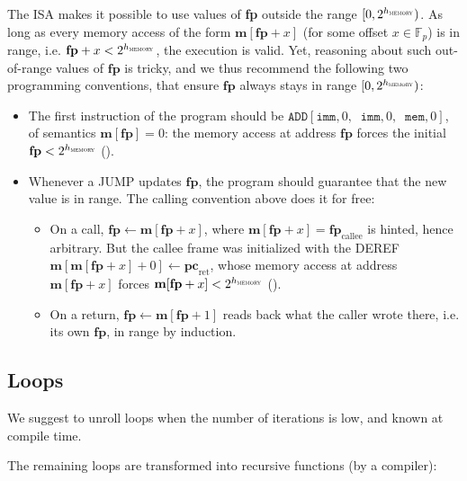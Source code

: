 \documentclass{article}
\theoremstyle{definition}
\newcommand{\Fp}{\mathbb F_p}
\begin{document}
\vspace{5mm}

The ISA makes it possible to use values of \textbf{fp} outside the range $[0, 2^{h_\textsc{memory}})$. As long as every memory access of the form $\textbf{m}[\textbf{fp} + x]$ (for some offset $x \in \Fp$) is in range, i.e. $\textbf{fp} + x < 2^{h_\textsc{memory}}$, the execution is valid. Yet, reasoning about such out-of-range values of $\textbf{fp}$ is tricky, and we thus recommend the following two programming conventions, that ensure $\textbf{fp}$ always stays in range $[0, 2^{h_\textsc{memory}})$:

\begin{itemize}
    \item The first instruction of the program should be $\texttt{ADD}[\texttt{imm}, 0,\;\; \texttt{imm}, 0,\;\; \texttt{mem}, 0]$, of semantics $\textbf{m}[\textbf{fp}] = 0$: the memory access at address $\textbf{fp}$ forces the initial $\textbf{fp} < 2^{h_\textsc{memory}}$ ().

    \item Whenever a JUMP updates $\textbf{fp}$, the program should guarantee that the new value is in range. The calling convention above does it for free:
    \begin{itemize}
        \item On a call, $\textbf{fp} \gets \textbf{m}[\textbf{fp} + x]$, where $\textbf{m}[\textbf{fp} + x] = \textbf{fp}_\text{callee}$ is hinted, hence arbitrary. But the callee frame was initialized with the DEREF $\textbf{m}[\textbf{m}[\textbf{fp} + x] + 0] \gets \textbf{pc}_\text{ret}$, whose memory access at address $\textbf{m}[\textbf{fp} + x]$ forces $\textbf{m}[\textbf{fp} + x] < 2^{h_\textsc{memory}}$ ().
        \item On a return, $\textbf{fp} \gets \textbf{m}[\textbf{fp} + 1]$ reads back what the caller wrote there, i.e. its own $\textbf{fp}$, in range by induction.
    \end{itemize}
\end{itemize}

\subsection{Loops}\label{sec:loops}

We suggest to unroll loops when the number of iterations is low, and known at compile time.

The remaining loops are transformed into recursive functions (by a compiler):
\end{document}
